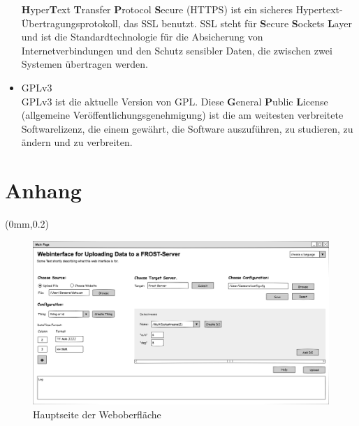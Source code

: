 \documentclass[12 pt]{article}
\begin{document}
\begin{itemize}
		\textbf{H}yper\textbf{T}ext \textbf{T}ransfer \textbf{P}rotocol \textbf{S}ecure (HTTPS) ist ein sicheres Hypertext-Übertragungsprotokoll, das SSL benutzt.
		SSL steht für \textbf{S}ecure \textbf{S}ockets \textbf{L}ayer und ist die Standardtechnologie für die Absicherung von Internetverbindungen und den Schutz sensibler Daten, die zwischen zwei Systemen übertragen werden.
		\item GPLv3 \\
		GPLv3 ist die aktuelle Version von GPL. Diese \textbf{G}eneral \textbf{P}ublic \textbf{L}icense (allgemeine Veröffentlichungsgenehmigung) ist die am weitesten verbreitete Softwarelizenz,
		die einem gewährt, die Software auszuführen, zu studieren, zu ändern und zu verbreiten.
	\end{itemize}
	
\newpage
\section{Anhang}

\begin{textblock*}{\paperwidth}(0mm,0.2\paperheight)
\begin{figure}[t]
\centering
\noindent\includegraphics[scale=0.5, angle=90]{images/gui}
\caption{\label{fig:guiMainA}Hauptseite der Weboberfläche}
\end{figure}
\end{textblock*}
	
\end{document}
